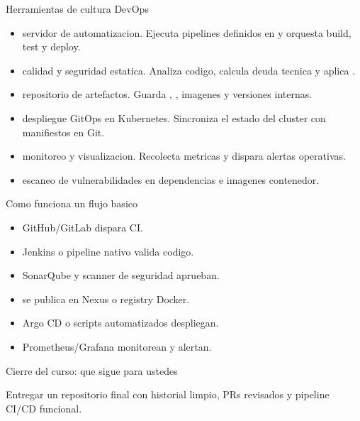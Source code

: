 \documentclass[aspectratio=169]{beamer}
\begin{document}
\begin{frame}{Herramientas de cultura DevOps}
	\small
	\begin{itemize}
		\item {} servidor de automatizacion. Ejecuta pipelines definidos en  y orquesta build, test y deploy.
		\item {} calidad y seguridad estatica. Analiza codigo, calcula deuda tecnica y aplica .
		\item {} repositorio de artefactos. Guarda , , imagenes y versiones internas.
		\item {} despliegue GitOps en Kubernetes. Sincroniza el estado del cluster con manifiestos en Git.
		\item {} monitoreo y visualizacion. Recolecta metricas y dispara alertas operativas.
		\item {} escaneo de vulnerabilidades en dependencias e imagenes contenedor.
	\end{itemize}
\end{frame}

\begin{frame}{Como funciona un flujo basico}
	\begin{itemize}
		\item {} GitHub/GitLab dispara CI.
		\item {} Jenkins o pipeline nativo valida codigo.
		\item {} SonarQube y scanner de seguridad aprueban.
		\item {} se publica en Nexus o registry Docker.
		\item {} Argo CD o scripts automatizados despliegan.
		\item {} Prometheus/Grafana monitorean y alertan.
	\end{itemize}
\end{frame}

\begin{frame}{Cierre del curso: que sigue para ustedes}
	\begin{darkbox}
		Entregar un repositorio final con historial limpio, PRs revisados y pipeline CI/CD funcional.
	\end{darkbox}
\end{frame}


\end{document}
